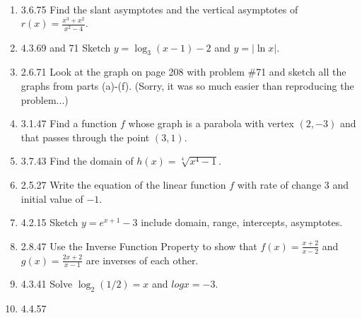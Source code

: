 \documentclass[11pt]{article}
\begin{document}
\begin{enumerate}
\item 3.6.75 Find the slant asymptotes and the vertical asymptotes of $r(x)=\frac{x^3+x^2}{x^2-4}.$

\item 4.3.69 and 71 Sketch $y= \log_3(x-1)-2$ and $y=| \ln x|$.

\item 2.6.71 Look at the graph on page 208 with problem \#71 and sketch all the graphs from parts (a)-(f). (Sorry, it was so much easier than reproducing the problem...)

\item  3.1.47 Find a function $f$ whose graph is a parabola with vertex $(2,-3)$ and that passes through the point $(3,1).$

\item 3.7.43 Find the domain of $h(x) = \sqrt[4]{x^4-1}.$

\item 2.5.27 Write the equation of the linear function $f$ with rate of change 3 and initial value of $-1.$

\item 4.2.15 Sketch $y=e^{x+1}-3$ include domain, range, intercepts, asymptotes.

\item 2.8.47 Use the Inverse Function Property to show that $f(x)=\frac{x+2}{x-2}$ and $g(x)=\frac{2x+2}{x-1}$ are inverses of each other.

\item 4.3.41 Solve $ \log_2 (1/2)=x$ and $log x = -3 $.

\item 4.4.57
\end{enumerate}
\end{document}
